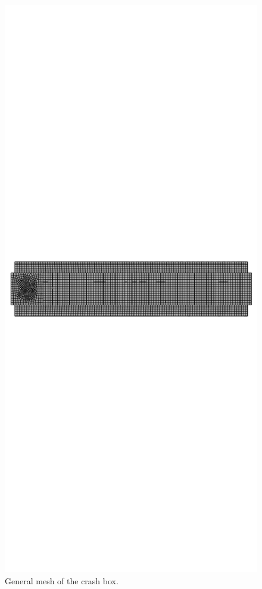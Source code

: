 \documentclass[
documentsize = a4, %
font = cmr, %
typesize = 11, %
printmode = true,
onehalfspacing = true,
language = en, %
titlepage = udciccp, %
degree = pt, %
dedication = true,
acknowledgements = true,
abstract-en = true,
abstract-es = false,
abstract-ga = false,
epigraphs = true,
toc = true,
lof = true,
lot = true,
frontmatterintoc = false,
notation = false,
minimal = false,
]{UDCthesis}
\begin{document}
\begin{figure}
	\centering
	\includegraphics[width=0.9\linewidth]{IMG_CUTRES/mesh}
	\caption{General mesh of the crash box.}
	\label{fig:mesh}
\end{figure}
\end{document}
